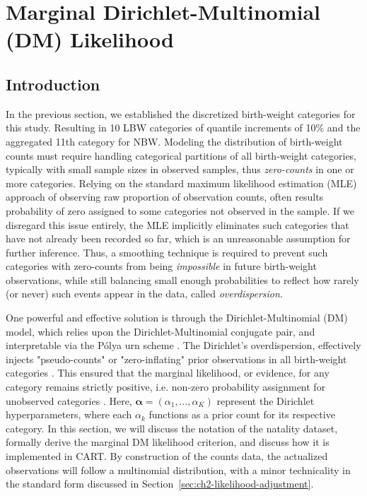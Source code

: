\section{Marginal Dirichlet-Multinomial (DM) Likelihood}
\label{sec:ch2-likelihood}
\subsection{Introduction}
\label{sec:ch2-likelihood-introduction}

In the previous section, we established the discretized birth-weight categories for this study. Resulting in 10 LBW categories of quantile increments of 10\% and the aggregated 11th category for NBW. Modeling the distribution of birth-weight counts must require handling categorical partitions of all birth-weight categories, typically with small sample sizes in observed samples, thus \emph{zero-counts} in one or more categories. Relying on the standard maximum likelihood estimation (MLE) approach of observing raw proportion of observation counts, often results probability of zero assigned to some categories not observed in the sample. If we disregard this issue entirely, the MLE implicitly eliminates such categories that have not already been recorded so far, which is an unreasonable assumption for further inference. Thus, a smoothing technique is required to prevent such categories with zero-counts from being \emph{impossible} in future birth-weight observations, while still balancing small enough probabilities to reflect how rarely (or never) such events appear in the data, called \emph{overdispersion}. 

One powerful and effective solution is through the Dirichlet-Multinomial (DM) model, which relies upon the Dirichlet-Multinomial conjugate pair, and interpretable via the Pólya urn scheme \parencite{mimno_polya, gundersen2020dirichlet-multinomial, minka2000estimating}. The Dirichlet's overdispersion, effectively injects "pseudo-counts" or "zero-inflating" prior observations in all birth-weight categories \parencite{mimno_polya, wiki:dirichlet-multinomial}. This ensured that the marginal likelihood, or evidence, for any category remains strictly positive, i.e. non-zero probability assignment for unobserved categories \parencite{wiki:dirichlet-multinomial}. Here, \(\boldsymbol{\alpha} = (\alpha_1, \dots, \alpha_K)\) represent the Dirichlet hyperparameters, where each \(\alpha_k\) functions as a prior count for its respective category. In this section, we will discuss the notation of the natality dataset, formally derive the marginal DM likelihood criterion, and discuss how it is implemented in CART. By construction of the counts data, the actualized observations will follow a multinomial distribution, with a minor technicality in the standard form discussed in Section~\ref{sec:ch2-likelihood-adjustment}. 

